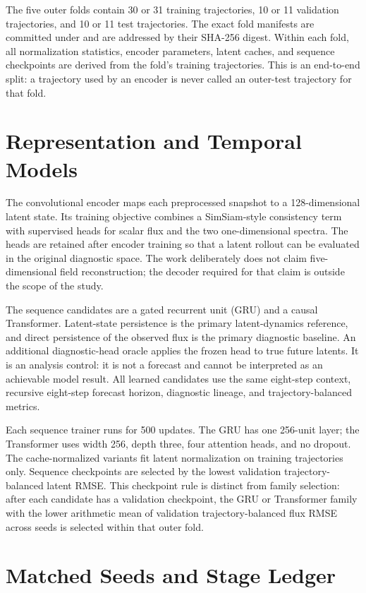 The five outer folds contain 30 or 31 training trajectories, 10 or 11 validation trajectories,
and 10 or 11 test trajectories. The exact fold manifests are committed under
 and are addressed by their SHA-256 digest. Within each fold, all
normalization statistics, encoder parameters, latent caches, and sequence checkpoints are derived
from the fold's training trajectories. This is an end-to-end split: a trajectory used by an
encoder is never called an outer-test trajectory for that fold.

\section{Representation and Temporal Models}

The convolutional encoder maps each preprocessed snapshot to a 128-dimensional latent state. Its
training objective combines a SimSiam-style consistency term with supervised heads for scalar flux
and the two one-dimensional spectra. The heads are retained after encoder training so that a
latent rollout can be evaluated in the original diagnostic space. The work deliberately does not
claim five-dimensional field reconstruction; the decoder required for that claim is outside the
scope of the study.

The sequence candidates are a gated recurrent unit (GRU) and a causal Transformer. Latent-state
persistence is the primary latent-dynamics reference, and direct persistence of the observed flux
is the primary diagnostic baseline. An additional diagnostic-head oracle applies the frozen head
to true future latents. It is an analysis control: it is not a forecast and cannot be interpreted
as an achievable model result. All learned candidates use the same eight-step context, recursive
eight-step forecast horizon, diagnostic lineage, and trajectory-balanced metrics.

Each sequence trainer runs for 500 updates. The GRU has one 256-unit layer; the Transformer uses
width 256, depth three, four attention heads, and no dropout. The cache-normalized variants fit
latent normalization on training trajectories only. Sequence checkpoints are selected by the
lowest validation trajectory-balanced latent RMSE. This checkpoint rule is distinct from family
selection: after each candidate has a validation checkpoint, the GRU or Transformer family with
the lower arithmetic mean of validation trajectory-balanced flux RMSE across seeds is selected
within that outer fold.

\section{Matched Seeds and Stage Ledger}

